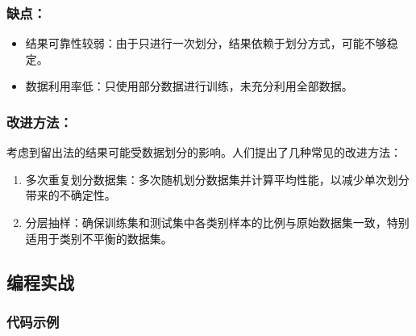 \subsubsection{缺点：}
\begin{itemize}
\item 结果可靠性较弱：由于只进行一次划分，结果依赖于划分方式，可能不够稳定。
\item 数据利用率低：只使用部分数据进行训练，未充分利用全部数据。
\end{itemize}

\subsubsection{改进方法：}
考虑到留出法的结果可能受数据划分的影响。人们提出了几种常见的改进方法：

\begin{enumerate}
\item 多次重复划分数据集：多次随机划分数据集并计算平均性能，以减少单次划分带来的不确定性。
\item 分层抽样：确保训练集和测试集中各类别样本的比例与原始数据集一致，特别适用于类别不平衡的数据集。
\end{enumerate}

\subsection{编程实战}
\subsubsection{代码示例}
